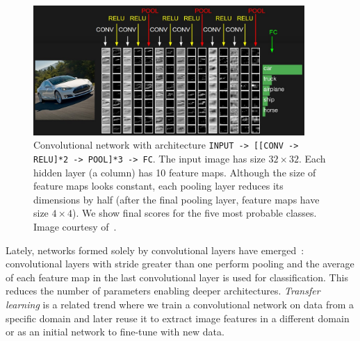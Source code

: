 \begin{figure}[h]
	\centering
	\includegraphics[width = 0.92\textwidth]{plots/convNetExample.jpeg}
	\caption[Convolutional network in action]{Convolutional network with architecture \texttt{INPUT -> [[CONV -> RELU]*2 -> POOL]*3 -> FC}. The input image has size $32\times 32$. Each hidden layer (a column) has 10 feature maps. Although the size of feature maps looks constant, each pooling layer reduces its dimensions by half (after the final pooling layer, feature maps have size $4\times 4$). We show final scores for the five most probable classes. Image courtesy of~\cite{Karpathy2016}.}
	\label{fig:ConvNetExample}
\end{figure}

Lately, networks formed solely by convolutional layers have emerged~\cite{Szegedy2014, He2015b}: convolutional layers with stride greater than one perform pooling and the average of each feature map in the last convolutional layer is used for classification. This reduces the number of parameters enabling deeper architectures.
\emph{Transfer learning} is a related trend where we train a convolutional network on data from a specific domain and later reuse it to extract image features in a different domain or as an initial network to fine-tune with new data.


